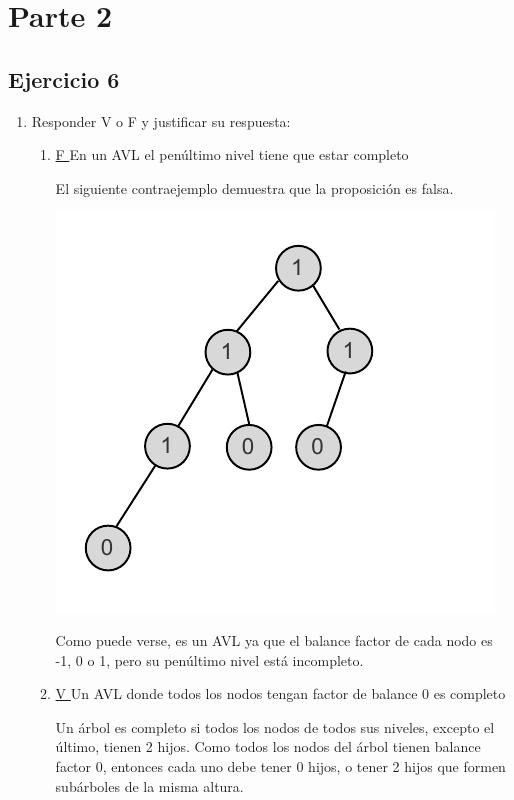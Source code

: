 \documentclass{article}
\begin{document}
\section*{Parte 2}
\subsection*{Ejercicio 6}
\begin{enumerate}
\item Responder V o F y justificar su respuesta:
\begin{enumerate}
\item \underline{ F } En un AVL el penúltimo nivel tiene que estar completo

El siguiente contraejemplo demuestra que la proposición es falsa.
\begin{center}
    \includegraphics[scale=0.7]{./img/ej6a-arbol.pdf}
\end{center}

Como puede verse, es un AVL ya que el balance factor de cada nodo es -1, 0 o 1, pero su penúltimo nivel está incompleto.


\item \underline{ V } Un AVL donde todos los nodos tengan factor de balance 0 es completo

Un árbol es completo si todos los nodos de todos sus niveles, excepto el último, tienen 2 hijos. Como todos los nodos del árbol tienen balance factor 0, entonces cada uno debe tener 0 hijos, o tener 2 hijos que formen subárboles de la misma altura.


\end{enumerate}
\end{enumerate}
\end{document}
